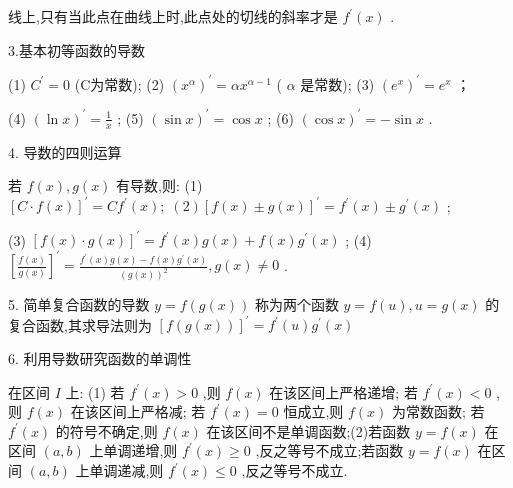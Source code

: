 \documentclass[10pt]{article}
\begin{document}
线上,只有当此点在曲线上时,此点处的切线的斜率才是 \({f}^{\prime }\left( x\right)\) .

3.基本初等函数的导数

(1) \({C}^{\prime } = 0\) (C为常数); (2) \({\left( {x}^{\alpha }\right) }^{\prime } = \alpha {x}^{\alpha  - 1}\) ( \(\alpha\) 是常数); (3) \({\left( {e}^{x}\right) }^{\prime } = {e}^{x}\) ；

(4) \({\left( \ln x\right) }^{\prime } = \frac{1}{x}\) ; (5) \({\left( \sin x\right) }^{\prime } = \cos x\) ; (6) \({\left( \cos x\right) }^{\prime } =  - \sin x\) .

4. 导数的四则运算

若 \(f\left( x\right) ,g\left( x\right)\) 有导数,则: (1) \({\left\lbrack  C \cdot  f\left( x\right) \right\rbrack  }^{\prime } = C{f}^{\prime }\left( x\right) ;\;\left( 2\right) {\left\lbrack  f\left( x\right)  \pm  g\left( x\right) \right\rbrack  }^{\prime } = {f}^{\prime }\left( x\right)  \pm  {g}^{\prime }\left( x\right)\) ;

(3) \({\left\lbrack  f\left( x\right)  \cdot  g\left( x\right) \right\rbrack  }^{\prime } = {f}^{\prime }\left( x\right) g\left( x\right)  + f\left( x\right) {g}^{\prime }\left( x\right)\) ; (4) \({\left\lbrack  \frac{f\left( x\right) }{g\left( x\right) }\right\rbrack  }^{\prime } = \frac{{f}^{\prime }\left( x\right) g\left( x\right)  - f\left( x\right) {g}^{\prime }\left( x\right) }{{\left( g\left( x\right) \right) }^{2}},g\left( x\right)  \neq  0\) .

5. 简单复合函数的导数 \(y = f\left( {g\left( x\right) }\right)\) 称为两个函数 \(y = f\left( u\right) ,u = g\left( x\right)\) 的复合函数,其求导法则为 \({\left\lbrack  f\left( g\left( x\right) \right) \right\rbrack  }^{\prime } = {f}^{\prime }\left( u\right) {g}^{\prime }\left( x\right)\)

6. 利用导数研究函数的单调性

在区间 \(I\) 上: (1) 若 \({f}^{\prime }\left( x\right)  > 0\) ,则 \(f\left( x\right)\) 在该区间上严格递增; 若 \({f}^{\prime }\left( x\right)  < 0\) ,则 \(f\left( x\right)\) 在该区间上严格减; 若 \({f}^{\prime }\left( x\right)  = 0\) 恒成立,则 \(f\left( x\right)\) 为常数函数; 若 \({f}^{\prime }\left( x\right)\) 的符号不确定,则 \(f\left( x\right)\) 在该区间不是单调函数;(2)若函数 \(y = f\left( x\right)\) 在区间 \(\left( {a,b}\right)\) 上单调递增,则 \({f}^{\prime }\left( x\right)  \geq  0\) ,反之等号不成立;若函数 \(y = f\left( x\right)\) 在区间 \(\left( {a,b}\right)\) 上单调递减,则 \({f}^{\prime }\left( x\right)  \leq  0\) ,反之等号不成立.
\end{document}
